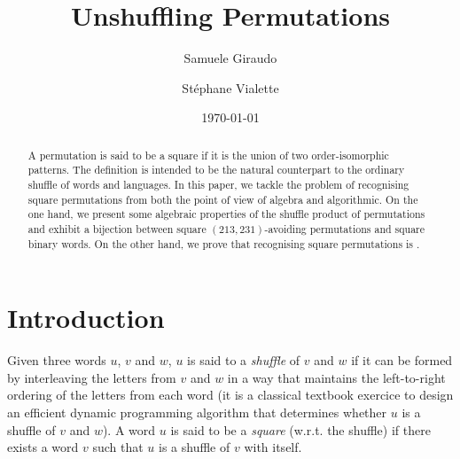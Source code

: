 \documentclass[a4paper]{llncs}
\begin{document}

\title{%
Unshuffling Permutations}%

\author{%
  Samuele Giraudo \and
  St\'ephane Vialette
}%
\date{\today}

\maketitle


\begin{abstract}
  A permutation is said to be a square if it is the union of two order-isomorphic
  patterns.
  The definition is intended to be the natural counterpart to the ordinary shuffle
  of words and languages.
  In this paper, we tackle the problem of recognising square permutations from both
  the point of view of algebra and algorithmic.
  On the one hand, we present some algebraic properties of the shuffle product of
  permutations and exhibit a bijection between square $(213,231)$-avoiding permutations
  and square binary words.
  On the other hand, we prove that recognising square permutations is \NPC.
\end{abstract}


\section{Introduction}
\label{section:Introduction}

Given three words $u$, $v$ and $w$, $u$ is said to a
\emph{shuffle} of $v$ and $w$ if it
can be formed by interleaving the letters from $v$ and $w$ in a way
that maintains the left-to-right ordering of the letters from each word
(it is a classical textbook exercice to
design an efficient dynamic programming algorithm that determines
whether $u$ is a shuffle of $v$ and $w$).
A word $u$ is said to be a \emph{square} (w.r.t. the shuffle) if there exists
a word $v$ such that $u$ is a shuffle of $v$ with itself.
\end{document}
